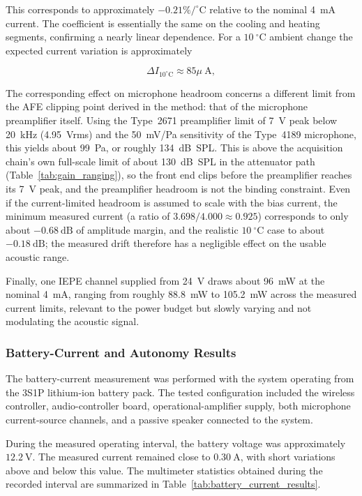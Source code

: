 This corresponds to approximately \(-0.21\%/^\circ\mathrm{C}\) relative to the nominal 4~mA current. The coefficient is essentially the same on the cooling and heating segments, confirming a nearly linear dependence. For a \(10~^\circ\mathrm{C}\) ambient change the expected current variation is approximately 

\begin{equation}
\Delta I_{10^{\circ} \mathrm{C}} \approx 85 \mu \mathrm{~A},
\end{equation}

The corresponding effect on microphone headroom concerns a different limit from the AFE clipping point derived in the method: that of the microphone preamplifier itself. Using the Type~2671 preamplifier limit of 7~V peak below 20~kHz (4.95~Vrms) and the 50~mV/Pa sensitivity of the Type~4189 microphone, this yields about 99~Pa, or roughly 134~dB~SPL. This is above the acquisition chain's own full-scale limit of about 130~dB~SPL in the attenuator path (Table~\ref{tab:gain_ranging}), so the front end clips before the preamplifier reaches its 7~V peak, and the preamplifier headroom is not the binding constraint. Even if the current-limited headroom is assumed to scale with the bias current, the minimum measured current (a ratio of \(3.698/4.000 \approx 0.925\)) corresponds to only about \(-0.68~\mathrm{dB}\) of amplitude margin, and the realistic \(10~^\circ\mathrm{C}\) case to about \(-0.18~\mathrm{dB}\); the measured drift therefore has a negligible effect on the usable acoustic range.

Finally, one IEPE channel supplied from 24~V draws about 96~mW at the nominal 4~mA, ranging from roughly 88.8~mW to 105.2~mW across the measured current limits, relevant to the power budget but slowly varying and not modulating the acoustic signal.

\subsubsection{Battery-Current and Autonomy Results}

The battery-current measurement was performed with the system operating from the 3S1P lithium-ion battery pack. The tested configuration included the wireless controller, audio-controller board, operational-amplifier supply, both microphone current-source channels, and a passive speaker connected to the system.

During the measured operating interval, the battery voltage was approximately \(12.2~\mathrm{V}\). The measured current remained close to \(0.30~\mathrm{A}\), with short variations above and below this value. The multimeter statistics obtained during the recorded interval are summarized in Table~\ref{tab:battery_current_results}.

